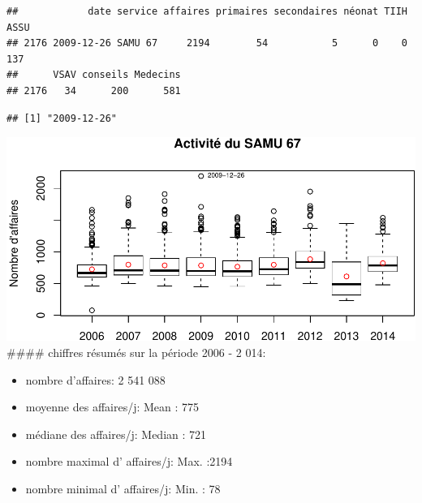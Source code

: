 \documentclass[]{article}
\newenvironment{Shaded}{\begin{snugshade}}{\end{snugshade}}
\newcommand{\KeywordTok}[1]{\textcolor[rgb]{0.13,0.29,0.53}{\textbf{{#1}}}}
\newcommand{\DataTypeTok}[1]{\textcolor[rgb]{0.13,0.29,0.53}{{#1}}}
\newcommand{\DecValTok}[1]{\textcolor[rgb]{0.00,0.00,0.81}{{#1}}}
\newcommand{\NormalTok}[1]{{#1}}
\begin{document}
\begin{verbatim}
##            date service affaires primaires secondaires néonat TIIH ASSU
## 2176 2009-12-26 SAMU 67     2194        54           5      0    0  137
##      VSAV conseils Medecins
## 2176   34      200      581
\end{verbatim}

\begin{Shaded}
\end{Shaded}

\begin{verbatim}
## [1] "2009-12-26"
\end{verbatim}

\begin{Shaded}
\end{Shaded}

\includegraphics{samu_files/figure-latex/samu67-4.pdf} \#\#\#\# chiffres
résumés sur la période 2006 - 2 014:

\begin{itemize}
\itemsep1pt\parskip0pt
\item
  nombre d'affaires: 2 541 088
\item
  moyenne des affaires/j: Mean : 775\\
\item
  médiane des affaires/j: Median : 721\\
\item
  nombre maximal d' affaires/j: Max. :2194\\
\item
  nombre minimal d' affaires/j: Min. : 78
\end{itemize}
\end{document}
